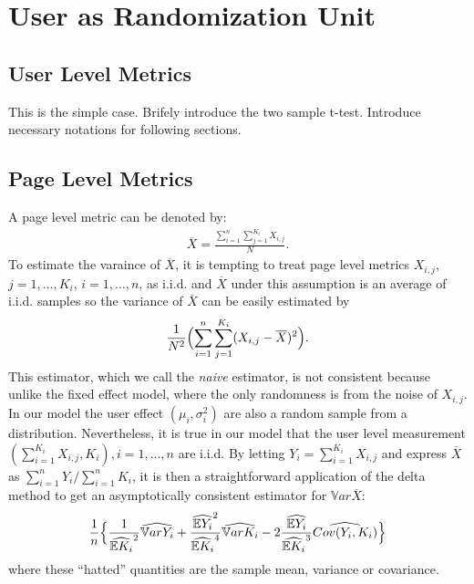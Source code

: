 \documentclass[10pt]{article}
\newcommand{\wht}{\widehat}
\newcommand{\var}{\ensuremath{\mathbb Var}}
\newcommand{\bbe}{\mathbb{E}}
\newcommand{\xbar}{\overline{X}}
\begin{document}
\section{User as Randomization Unit}\label{user}

\subsection{User Level Metrics}
This is the simple case. Brifely introduce the two sample t-test. Introduce necessary notations for following sections. 

\subsection{Page Level Metrics}
A page level metric can be denoted by:
\begin{align*}
\xbar= \frac{\sum_{i=1}^n\sum_{j=1}^{K_i} X_{i,j}}{N}.
\end{align*}
To estimate the varaince of $\xbar$, it is tempting to treat page level metrics $X_{i,j}$, $j=1,\dots,K_i$, $i=1,\dots,n$, as i.i.d. and $\xbar$ under this assumption is an average of i.i.d. samples so the variance of $\xbar$ can be easily estimated by
\begin{align*}
\frac{1}{N^2} \Bigl (\sum_{i=1}^n \sum_{j=1}^{K_i} (X_{i,j}-\overline{X})^2 \Bigr ).
\end{align*}
This estimator, which we call the \emph{naive} estimator,  is not consistent because unlike the fixed effect model, where the only randomness is from the noise of $X_{i,j}$. In our model the user effect $(\mu_i,\sigma_i^2)$ are also a random sample from a distribution. Nevertheless, it is true in our model that the user level measurement $(\sum_{i=1}^{K_i} X_{i,j}, K_i),i=1,\dots,n$ are i.i.d. By letting $Y_i = \sum_{i=1}^{K_i} X_{i,j}$ and express $\xbar$ as $\sum_{i=1}^n Y_i / \sum_{i=1}^n K_i$, it is then a straightforward application of the delta method to get an asymptotically consistent estimator for $\var \xbar$:
\begin{align*}
\frac{1}{n} \Bigl\{ \frac{1}{\wht{\bbe K_i}^2}\wht{\var Y_i} + \frac{\wht{\bbe Y_i}^2}{\wht{\bbe K_i}^4}\wht{\var K_i} - 2\frac{\wht{\bbe Y_i}}{\wht{\bbe K_i}^3} \wht{Cov(Y_i,K_i)} \Bigr\} 
\end{align*}
where these ``hatted'' quantities are the sample mean, variance or covariance. 
\end{document}
